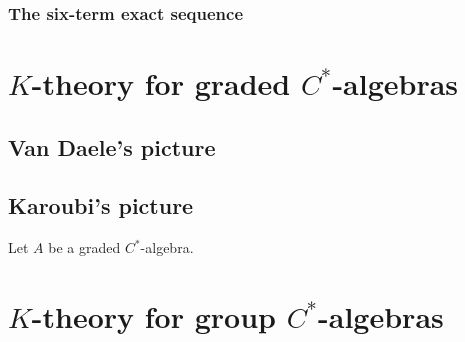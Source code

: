 \subsection{The six-term exact sequence}

\chapter{$K$-theory for graded $C^*$-algebras}
\section{Van Daele's picture}

\section{Karoubi's picture}
\begin{definition}
Let $A$ be a graded $C^*$-algebra. 
\end{definition}


\chapter{$K$-theory for group $C^*$-algebras}